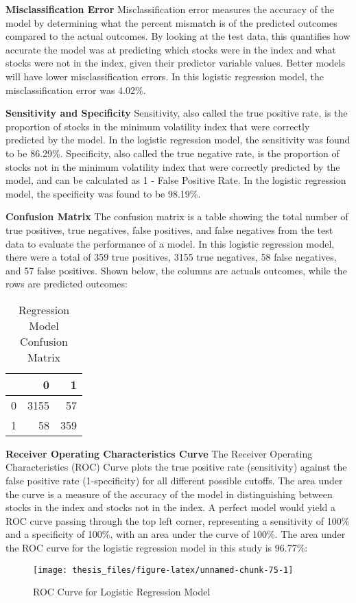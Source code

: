 \documentclass[12pt,twoside]{reedthesis}
\theoremstyle{definition}
\theoremstyle{definition}
\theoremstyle{definition}
\theoremstyle{remark}
\begin{document}
\hfill\break
\textbf{Misclassification Error} \hfill\break
Misclassification error measures the accuracy of the model by
determining what the percent mismatch is of the predicted outcomes
compared to the actual outcomes. By looking at the test data, this
quantifies how accurate the model was at predicting which stocks were in
the index and what stocks were not in the index, given their predictor
variable values. Better models will have lower misclassification errors.
In this logistic regression model, the misclassification error was
4.02\%.

\hfill\break
\textbf{Sensitivity and Specificity} \hfill\break
Sensitivity, also called the true positive rate, is the proportion of
stocks in the minimum volatility index that were correctly predicted by
the model. In the logistic regression model, the sensitivity was found
to be 86.29\%. Specificity, also called the true negative rate, is the
proportion of stocks not in the minimum volatility index that were
correctly predicted by the model, and can be calculated as 1 - False
Positive Rate. In the logistic regression model, the specificity was
found to be 98.19\%.

\hfill\break
\textbf{Confusion Matrix} \hfill\break
The confusion matrix is a table showing the total number of true
positives, true negatives, false positives, and false negatives from the
test data to evaluate the performance of a model. In this logistic
regression model, there were a total of 359 true positives, 3155 true
negatives, 58 false negatives, and 57 false positives. Shown below, the
columns are actuals outcomes, while the rows are predicted outcomes:
\begin{longtable}[t]{lrr}
\caption{\label{tab:unnamed-chunk-74}Regression Model Confusion Matrix}\\
\toprule
  & 0 & 1\\
\midrule
0 & 3155 & 57\\
1 & 58 & 359\\
\bottomrule
\end{longtable}
\hfill\break
\textbf{Receiver Operating Characteristics Curve} \hfill\break
The Receiver Operating Characteristics (ROC) Curve plots the true
positive rate (sensitivity) against the false positive rate
(1-specificity) for all different possible cutoffs. The area under the
curve is a measure of the accuracy of the model in distinguishing
between stocks in the index and stocks not in the index. A perfect model
would yield a ROC curve passing through the top left corner,
representing a sensitivity of 100\% and a specificity of 100\%, with an
area under the curve of 100\%. The area under the ROC curve for the
logistic regression model in this study is 96.77\%: \hfill\break
\begin{figure}

{\centering \texttt{[image: thesis\_files/figure-latex/unnamed-chunk-75-1]} 

}

\caption{ROC Curve for Logistic Regression Model}\label{fig:unnamed-chunk-75}
\end{figure}
\hfill\break
\end{document}
